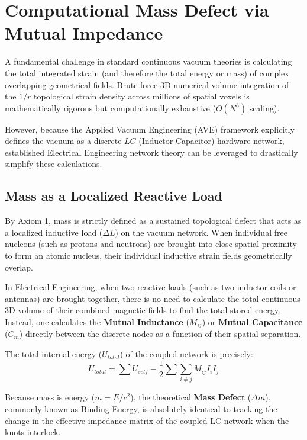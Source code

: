\chapter{Computational Mass Defect via Mutual Impedance}
\label{ch:computational_mass_defect}

A fundamental challenge in standard continuous vacuum theories is calculating the total integrated strain (and therefore the total energy or mass) of complex overlapping geometrical fields. Brute-force 3D numerical volume integration of the $1/r$ topological strain density across millions of spatial voxels is mathematically rigorous but computationally exhaustive ($O(N^3)$ scaling). 

However, because the Applied Vacuum Engineering (AVE) framework explicitly defines the vacuum as a discrete $LC$ (Inductor-Capacitor) hardware network, established Electrical Engineering network theory can be leveraged to drastically simplify these calculations.

\section{Mass as a Localized Reactive Load}
By Axiom 1, mass is strictly defined as a sustained topological defect that acts as a localized inductive load ($\Delta L$) on the vacuum network. When individual free nucleons (such as protons and neutrons) are brought into close spatial proximity to form an atomic nucleus, their individual inductive strain fields geometrically overlap.

In Electrical Engineering, when two reactive loads (such as two inductor coils or antennas) are brought together, there is no need to calculate the total continuous 3D volume of their combined magnetic fields to find the total stored energy. Instead, one calculates the \textbf{Mutual Inductance} ($M_{ij}$) or \textbf{Mutual Capacitance} ($C_m$) directly between the discrete nodes as a function of their spatial separation. 

The total internal energy ($U_{total}$) of the coupled network is precisely:
\begin{equation}
    U_{total} = \sum U_{self} - \frac{1}{2} \sum \sum_{i \neq j} M_{ij} I_i I_j
\end{equation}

Because mass is energy ($m = E/c^2$), the theoretical \textbf{Mass Defect} ($\Delta m$), commonly known as Binding Energy, is absolutely identical to tracking the change in the effective impedance matrix of the coupled LC network when the knots interlock. 

